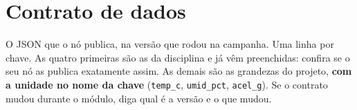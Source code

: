 \section{Contrato de dados}
\label{sec:contrato-dados}
\rubricaJustificativa

\begin{orientacao}
O JSON que o nó publica, na versão que rodou na campanha. Uma linha por
chave. As quatro primeiras são as da disciplina e já vêm preenchidas:
confira se o seu nó as publica exatamente assim. As demais são as
grandezas do projeto, \textbf{com a unidade no nome da chave}
(\texttt{temp\_c}, \texttt{umid\_pct}, \texttt{acel\_g}). Se o contrato
mudou durante o módulo, diga qual é a versão e o que mudou.
\end{orientacao}


